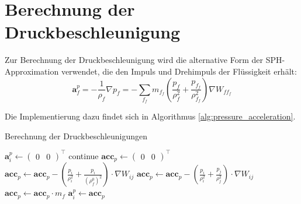 \documentclass[11pt,
a4paper,
parskip=half, %
BCOR=10mm, %
english,
ngerman]{scrreprt}
\begin{document}
\section{Berechnung der Druckbeschleunigung}
Zur Berechnung der Druckbeschleunigung wird die alternative Form der SPH-Approximation verwendet, die den Impuls und Drehimpuls der Flüssigkeit erhält:
\begin{equation}
    \textbf{a}_f^p = -\frac{1}{\rho_f} \nabla p_f = -\sum_{f_f} m_{f_f} \left( \frac{p_f}{\rho_f^2} + \frac{p_{f_f}}{\rho_{f_f}^2} \right) \nabla W_{ff_f}
\end{equation}

Die Implementierung dazu findet sich in Algorithmus \ref{alg:pressure_acceleration}.

\begin{algorithm}
    \caption{Berechnung der Druckbeschleunigungen}
    \label{alg:pressure_acceleration}
    \begin{algorithmic}
            \State $\textbf{a}_i^p \gets \begin{pmatrix}0 & 0 \end{pmatrix}^\intercal$
            \State continue
        \EndIf
        \State $\textbf{acc}_p \gets \begin{pmatrix}0 & 0 \end{pmatrix}^\intercal$
        \State
        \State {}
                \State $\textbf{acc}_p \gets \textbf{acc}_p - \left(\frac{p_i}{\rho_i^2} + \frac{p_i}{\left(\rho_f^0\right)^2}\right) \cdot \nabla W_{ij}$ 
            \Else
                \State $\textbf{acc}_p \gets \textbf{acc}_p - \left(\frac{p_i}{\rho_i^2} + \frac{p_j}{\rho_j^2}\right) \cdot \nabla W_{ij}$
            \EndIf
        \EndFor
        \State $\textbf{acc}_p \gets \textbf{acc}_p \cdot m_f$
        \State
        \State $\textbf{a}_i^p \gets \textbf{acc}_p$
    \EndFor
    \end{algorithmic}
\end{algorithm}
\end{document}
